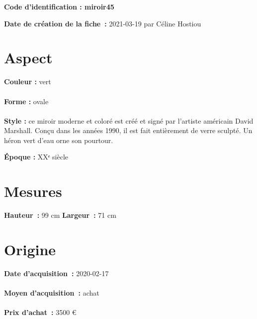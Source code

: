 
       {\bf \huge Code d’identification : miroir45} \\
    \newline \hr \begin{center}  \end{center} 
    {\bf \large Date de création de la fiche :} 2021-03-19 {par Céline Hostiou}  \\ \hr 
    \section* {Aspect} 
    {\bf \large Couleur :} vert
    \\ \\ {\bf \large Forme :} ovale 
    \\ \\ {\bf \large Style :} 
            ce miroir moderne et coloré est créé et signé par l’artiste américain David Marshall. 
            Conçu dans les années 1990, il est fait entièrement de verre sculpté. Un héron vert d’eau orne son pourtour.
        
        {\bf \large Époque :} XXᵉ siècle 
    \section* {Mesures}
     {\bf \large Hauteur :} 99 cm
   {\bf \large Largeur :} 71 cm
   \section* {Origine} 
    {\bf \large Date d’acquisition :} 2020-02-17 \\ \\
    {\bf \large Moyen d’acquisition :} achat \\ \\
     {\bf \large Prix d’achat :} 3500 €   
